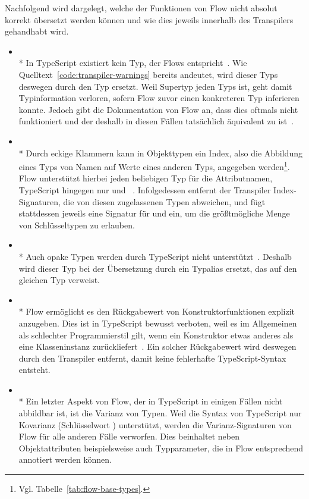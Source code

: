 Nachfolgend wird dargelegt, welche der Funktionen von Flow nicht absolut korrekt übersetzt werden können und wie dies jeweils innerhalb des Transpilers gehandhabt wird.

\begin{itemize}
  \item {}\\*
    In TypeScript existiert kein Typ, der Flows  entspricht~\autocite{TS:GITHUB:NO_EXISTENTIAL_TYPE}. Wie Quelltext~\ref{code:transpiler-warnings} bereits andeutet, wird dieser Typs deswegen durch den Typ  ersetzt. Weil  Supertyp jeden Typs ist, geht damit Typinformation verloren, sofern Flow zuvor einen konkreteren Typ inferieren konnte. Jedoch gibt die Dokumentation von Flow an, dass dies oftmals nicht funktioniert und der  deshalb in diesen Fällen tatsächlich äquivalent zu  ist~\autocite{FLOW:LINT_RULE_REFERENCE}.
  \medbreak
  \item {}\\*
    Durch eckige Klammern kann in Objekttypen ein Index, also die Abbildung eines Typs von Namen auf Werte eines anderen Typs, angegeben werden\footnote{Vgl. Tabelle~\ref{tab:flow-base-types}.}. Flow unterstützt hierbei jeden beliebigen Typ für die Attributnamen, TypeScript hingegen nur  und ~\autocite{TS:HANDBOOK:INTERFACES}. Infolgedessen entfernt der Transpiler Index-Signaturen, die von diesen zugelassenen Typen abweichen, und fügt stattdessen jeweils eine Signatur für  und  ein, um die größtmögliche Menge von Schlüsseltypen zu erlauben.
  \medbreak
  \item {}\\*
    Auch opake Typen werden durch TypeScript nicht unterstützt~\autocite{TS:GITHUB:NO_OPAQUE_TYPE}. Deshalb wird dieser Typ bei der Übersetzung durch ein Typalias ersetzt, das auf den gleichen Typ verweist.
  \medbreak
  \item {}\\*
    Flow ermöglicht es den Rückgabewert von Konstruktorfunktionen explizit anzugeben. Dies ist in TypeScript bewusst verboten, weil es im Allgemeinen als schlechter Programmierstil gilt, wenn ein Konstruktor etwas anderes als eine Klasseninstanz zurückliefert~\autocite{TS:GITHUB:CONSTRUCTOR_RETURN_TYPE}. Ein solcher Rückgabewert wird deswegen durch den Transpiler entfernt, damit keine fehlerhafte TypeScript-Syntax entsteht.
  \medbreak
  \item {}\\*
    Ein letzter Aspekt von Flow, der in TypeScript in einigen Fällen nicht abbildbar ist, ist die Varianz von Typen. Weil die Syntax von TypeScript nur Kovarianz (Schlüsselwort ) unterstützt, werden die Varianz-Signaturen von Flow für alle anderen Fälle verworfen. Dies beinhaltet neben Objektattributen beispielsweise auch Typparameter, die in Flow entsprechend annotiert werden können.
\end{itemize}

